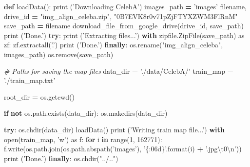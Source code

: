 \documentclass[]{book}
\newenvironment{Shaded}{\begin{snugshade}}{\end{snugshade}}
\newcommand{\KeywordTok}[1]{\textcolor[rgb]{0.13,0.29,0.53}{\textbf{#1}}}
\newcommand{\DecValTok}[1]{\textcolor[rgb]{0.00,0.00,0.81}{#1}}
\newcommand{\CharTok}[1]{\textcolor[rgb]{0.31,0.60,0.02}{#1}}
\newcommand{\SpecialCharTok}[1]{\textcolor[rgb]{0.00,0.00,0.00}{#1}}
\newcommand{\StringTok}[1]{\textcolor[rgb]{0.31,0.60,0.02}{#1}}
\newcommand{\ImportTok}[1]{#1}
\newcommand{\CommentTok}[1]{\textcolor[rgb]{0.56,0.35,0.01}{\textit{#1}}}
\newcommand{\ControlFlowTok}[1]{\textcolor[rgb]{0.13,0.29,0.53}{\textbf{#1}}}
\newcommand{\OperatorTok}[1]{\textcolor[rgb]{0.81,0.36,0.00}{\textbf{#1}}}
\newcommand{\BuiltInTok}[1]{#1}
\newcommand{\NormalTok}[1]{#1}
\theoremstyle{definition}
\theoremstyle{definition}
\theoremstyle{definition}
\theoremstyle{remark}
\begin{document}
\begin{Shaded}
\begin{Highlighting}[]
\KeywordTok{def}\NormalTok{ loadData():}
    \BuiltInTok{print}\NormalTok{ (}\StringTok{'Downloading CelebA'}\NormalTok{)}
\NormalTok{    images_path }\OperatorTok{=} \StringTok{'images'}
\NormalTok{    filename, drive_id  }\OperatorTok{=} \StringTok{"img_align_celeba.zip"}\NormalTok{, }\StringTok{"0B7EVK8r0v71pZjFTYXZWM3FlRnM"}
\NormalTok{    save_path }\OperatorTok{=}\NormalTok{ filename}
\NormalTok{    download_file_from_google_drive(drive_id, save_path)}
    \BuiltInTok{print}\NormalTok{ (}\StringTok{'Done.'}\NormalTok{)}
    \ControlFlowTok{try}\NormalTok{:}
        \BuiltInTok{print}\NormalTok{ (}\StringTok{'Extracting files...'}\NormalTok{)}
        \ControlFlowTok{with}\NormalTok{ zipfile.ZipFile(save_path) }\ImportTok{as}\NormalTok{ zf:}
\NormalTok{            zf.extractall(}\StringTok{'.'}\NormalTok{)}
        \BuiltInTok{print}\NormalTok{ (}\StringTok{'Done.'}\NormalTok{)}
    \ControlFlowTok{finally}\NormalTok{:}
\NormalTok{        os.rename(}\StringTok{"img_align_celeba"}\NormalTok{, images_path)}
\NormalTok{        os.remove(save_path)}


\CommentTok{# Paths for saving the map files}
\NormalTok{data_dir }\OperatorTok{=} \StringTok{'./data/CelebA/'}
\NormalTok{train_map }\OperatorTok{=} \StringTok{'./train_map.txt'}

\NormalTok{root_dir }\OperatorTok{=}\NormalTok{ os.getcwd()}

\ControlFlowTok{if} \KeywordTok{not}\NormalTok{ os.path.exists(data_dir):}
\NormalTok{    os.makedirs(data_dir)}

\ControlFlowTok{try}\NormalTok{:}
\NormalTok{    os.chdir(data_dir)   }
\NormalTok{    loadData()}
    \BuiltInTok{print}\NormalTok{ (}\StringTok{'Writing train map file...'}\NormalTok{)}
    \ControlFlowTok{with} \BuiltInTok{open}\NormalTok{(train_map, }\StringTok{'w'}\NormalTok{) }\ImportTok{as}\NormalTok{ f:}
        \ControlFlowTok{for}\NormalTok{ i }\KeywordTok{in} \BuiltInTok{range}\NormalTok{(}\DecValTok{1}\NormalTok{, }\DecValTok{162771}\NormalTok{):}
\NormalTok{            f.write(os.path.join(os.path.abspath(}\StringTok{'images'}\NormalTok{), }\StringTok{'}\SpecialCharTok{\{:06d\}}\StringTok{'}\NormalTok{.}\BuiltInTok{format}\NormalTok{(i) }\OperatorTok{+} \StringTok{'.jpg}\CharTok{\textbackslash{}t}\StringTok{0}\CharTok{\textbackslash{}n}\StringTok{'}\NormalTok{))}
        \BuiltInTok{print}\NormalTok{ (}\StringTok{'Done.'}\NormalTok{)}
\ControlFlowTok{finally}\NormalTok{:}
\NormalTok{    os.chdir(}\StringTok{"../.."}\NormalTok{)}
\end{Highlighting}
\end{Shaded}
\end{document}
